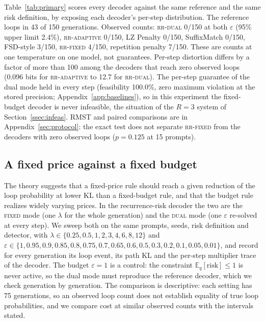 \documentclass[make,article,submit,pdftex]{Definitions/mdpi}
\providecommand{\E}{}\renewcommand{\E}{\mathbb{E}}
\begin{document}
Table~\ref{tab:primary} scores every decoder against the same reference and the same risk definition, by exposing each decoder's per-step distribution. The reference loops in 43 of 150 generations. Observed counts: \textsc{rr-dual} 0/150 at both $\varepsilon$ (95\% upper limit 2.4\%), \textsc{rr-adaptive} 0/150, LZ Penalty 0/150, SuffixMatch 0/150, FSD-style 3/150, \textsc{rr-fixed} 4/150, repetition penalty 7/150. These are counts at one temperature on one model, not guarantees. Per-step distortion differs by a factor of more than 100 among the decoders that reach zero observed loops (0.096 bits for \textsc{rr-adaptive} to 12.7 for \textsc{rr-dual}). The per-step guarantee of the dual mode held in every step (feasibility 100.0\%, zero maximum violation at the stored precision; Appendix~\ref{app:baselines}), so in this experiment the fixed-budget decoder is never infeasible, the situation of the $R=3$ system of Section~\ref{ssec:infeas}. RMST and paired comparisons are in Appendix~\ref{sec:protocol}: the exact test does not separate \textsc{rr-fixed} from the decoders with zero observed loops ($p=0.125$ at 15 prompts).

\subsection{A fixed price against a fixed budget}\label{ssec:frontier}
The theory suggests that a fixed-price rule should reach a given reduction of the loop probability at lower KL than a fixed-budget rule, and that the budget rule realizes widely varying prices. In the recurrence-risk decoder the two are the \textsc{fixed} mode (one $\lambda$ for the whole generation) and the \textsc{dual} mode (one $\varepsilon$ re-solved at every step). We sweep both on the same prompts, seeds, risk definition and detector, with $\lambda\in\{0.25,0.5,1,2,3,4,6,8,12\}$ and $\varepsilon\in\{1,0.95,0.9,0.85,0.8,0.75,0.7,0.65,0.6,0.5,0.3,0.2,0.1,0.05,0.01\}$, and record for every generation its loop event, its path KL and the per-step multiplier trace of the decoder. The budget $\varepsilon=1$ is a control: the constraint $\E_q[\mathrm{risk}]\le1$ is never active, so the dual mode must reproduce the reference decoder, which we check generation by generation. The comparison is descriptive: each setting has 75 generations, so an observed loop count does not establish equality of true loop probabilities, and we compare cost at similar observed counts with the intervals stated.
\end{document}
